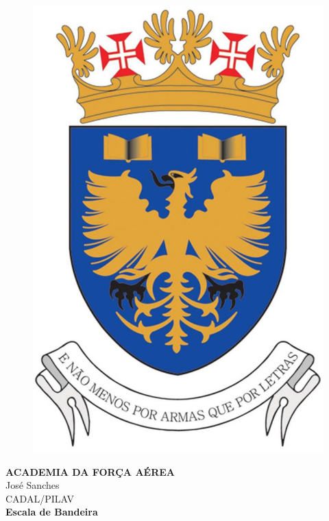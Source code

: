 \begin{titlepage}
    \begin{center}
    \begin{figure}
        \centering
        \includegraphics[width=.30\linewidth]{Imagens/img1_BrasAfa.jpg}
    \end{figure}
    {\fontsize{15}{48}\selectfont \bfseries ACADEMIA DA FORÇA AÉREA} 
    \\\vspace{20pt}
    {\Large José Sanches} \\
    {\Large CADAL/PILAV} \\
    \vspace{15pt}
    {\Large\textbf{Escala de Bandeira}}
    \end{center}
    \vspace{15pt}
\end{titlepage}